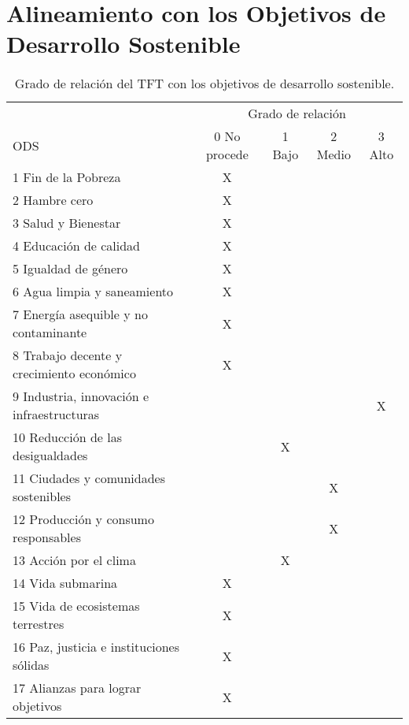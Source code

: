 \section{Alineamiento con los Objetivos de Desarrollo Sostenible}
\begin{table}[H]
\caption{Grado de relación del TFT con los objetivos de desarrollo sostenible.}
\label{tab:ODS}
\centering
\begin{tabular}{|l|c|c|c|c|}
\cline{1-5}
 & \multicolumn{4}{c|}{Grado de relación} \\ \cline{2-5}
ODS & 0 No procede & 1 Bajo & 2 Medio & 3 Alto \\ \cline{1-5}
1 Fin de la Pobreza                & X &   &   &   \\ \cline{1-5}
2 Hambre cero                      & X &   &   &   \\ \cline{1-5}
3 Salud y Bienestar                & X &   &   &   \\ \cline{1-5}
4 Educación de calidad             & X &   &   &   \\ \cline{1-5}
5 Igualdad de género               & X &   &   &   \\ \cline{1-5}
6 Agua limpia y saneamiento        & X &   &   &   \\ \cline{1-5}
7 Energía asequible y no contaminante & X &   &   &   \\ \cline{1-5}
8 Trabajo decente y crecimiento económico & X &   &   &   \\ \cline{1-5}
9 Industria, innovación e infraestructuras &   &   &   & X \\ \cline{1-5}
10 Reducción de las desigualdades  &   & X &   &   \\ \cline{1-5}
11 Ciudades y comunidades sostenibles &   &   & X &   \\ \cline{1-5}
12 Producción y consumo responsables &   &   & X &   \\ \cline{1-5} 
13 Acción por el clima             &   & X &   &   \\ \cline{1-5}
14 Vida submarina                  & X &   &   &   \\ \cline{1-5}
15 Vida de ecosistemas terrestres  & X &   &   &   \\ \cline{1-5}
16 Paz, justicia e instituciones sólidas & X &   &   &   \\ \cline{1-5}
17 Alianzas para lograr objetivos  & X &   &   &   \\ \cline{1-5}
\end{tabular}
\end{table}

